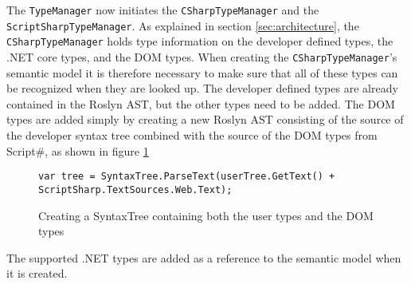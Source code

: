 
The \texttt{TypeManager} now initiates the \texttt{CSharpTypeManager} and the \texttt{ScriptSharpTypeManager}. As explained in section \ref{sec:architecture}, the \texttt{CSharpTypeManager} holds type information on the developer defined types, the .NET core types, and the DOM types.
 When creating the \texttt{CSharpTypeManager}'s semantic model it is therefore necessary to make sure that all of these types can be recognized when they are looked up. The developer defined types are already contained in the Roslyn AST, but the other types need to be added. The DOM types are added simply by creating a new Roslyn AST consisting of the source of the developer syntax tree combined with the source of the DOM types from Script\#, as shown in figure \ref{fig:init_mics_add_dom_types}

\begin{figure}[H]
\begin{lstlisting}[language=CSharp,classoffset=1,morekeywords={SyntaxTree}]
var tree = SyntaxTree.ParseText(userTree.GetText() + ScriptSharp.TextSources.Web.Text);
\end{lstlisting}
\caption{Creating a SyntaxTree containing both the user types and the DOM types}
\label{fig:init_mics_add_dom_types}
\end{figure}

The supported .NET types are added as a reference to the semantic model when it is created.





